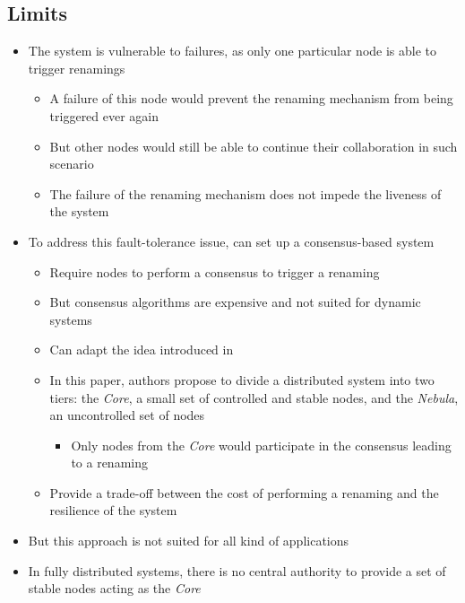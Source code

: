 \documentclass{article}
\begin{document}
\subsection{Limits}

\begin{itemize}
    \item The system is vulnerable to failures, as only one particular node is able to trigger renamings
    \begin{itemize}
        \item A failure of this node would prevent the renaming mechanism from being triggered ever again
        \item But other nodes would still be able to continue their collaboration in such scenario
        \item The failure of the renaming mechanism does not impede the liveness of the system
    \end{itemize}
    \item To address this fault-tolerance issue, can set up a consensus-based system
    \begin{itemize}
        \item Require nodes to perform a consensus to trigger a renaming
        \item But consensus algorithms are expensive and not suited for dynamic systems
        \item Can adapt the idea introduced in \cite{letia:hal-01248270}
        \item In this paper, authors propose to divide a distributed system into two tiers:
        the \emph{Core}, a small set of controlled and stable nodes, and the \emph{Nebula}, an uncontrolled set of nodes
        \begin{itemize}
            \item Only nodes from the \emph{Core} would participate in the consensus leading to a renaming
        \end{itemize}
        \item Provide a trade-off between the cost of performing a renaming and the resilience of the system
    \end{itemize}
    \item But this approach is not suited for all kind of applications
    \item In fully distributed systems, there is no central authority to provide a set of stable nodes acting as the \emph{Core}
\end{itemize}
\end{document}
